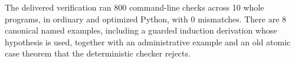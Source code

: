 The delivered verification ran 800 command-line checks across 10 whole programs, in ordinary and optimized Python, with 0 mismatches. There are 8 canonical named examples, including a guarded induction derivation whose hypothesis is used, together with an administrative example and an old atomic case theorem that the deterministic checker rejects.
